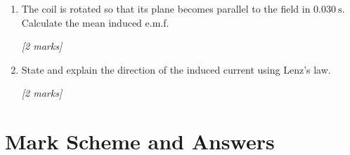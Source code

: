 \begin{tcolorbox}[colback=white, colframe=midblue, breakable]
\begin{minipage}{\linewidth}
\begin{enumerate}[label=(\alph*)]
  \item The coil is rotated so that its plane becomes parallel to the field in $0.030\ \text{s}$. Calculate the mean induced e.m.f.
  \par\hfill\textit{[2 marks]}
  \vspace{3cm}

  \item State and explain the direction of the induced current using Lenz's law.
  \par\hfill\textit{[2 marks]}
  \vspace{3cm}
\end{enumerate}
\end{minipage}

\end{tcolorbox}

\section{Mark Scheme and Answers}

